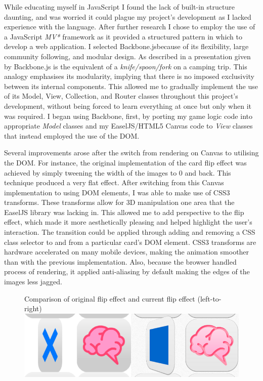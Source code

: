 \documentclass[final]{cmpreport}
\begin{document}
While educating myself in JavaScript I found the lack of built-in structure daunting, and was worried it could plague my project's development as I lacked experience with the language. After further research I chose to employ the use of a JavaScript \textit{MV*} framework as it provided a structured pattern in which to develop a web application. I selected Backbone.js\footnotemark because of its flexibility, large community following, and modular design. As described in a presentation given by \citet{Bull} Backbone.js is the equivalent of a \textit{knife/spoon/fork} on a camping trip. This analogy emphasises its modularity, implying that there is no imposed exclusivity between its internal components. This allowed me to gradually implement the use of its Model, View, Collection, and Router classes throughout this project's development, without being forced to learn everything at once but only when it was required. I began using Backbone, first, by porting my game logic code into appropriate \textit{Model} classes and my EaselJS/HTML5 Canvas code to \textit{View} classes that instead employed the use of the DOM.

Several improvements arose after the switch from rendering on Canvas to utilising the DOM. For instance, the original implementation of the card flip effect was achieved by simply tweening the width of the images to 0 and back. This technique produced a very flat effect. After switching from this Canvas implementation to using DOM elements, I was able to make use of CSS3 transforms. These transforms allow for 3D manipulation one area that the EaselJS library was lacking in. This allowed me to add perspective to the flip effect, which made it more aesthetically pleasing and helped highlight the user's interaction. The transition could be applied through adding and removing a CSS class selector to and from a particular card's DOM element. CSS3 transforms are hardware accelerated on many mobile devices, making the animation smoother than with the previous implementation. Also, because the browser handled process of rendering, it applied anti-aliasing by default making the edges of the images less jagged.

\begin{figure}[h!]{Comparison of original flip effect and current flip effect (left-to-right)\label{transforms}}
  \includegraphics[width=1.0\textwidth]{transforms.png}
\end{figure}
\end{document}
